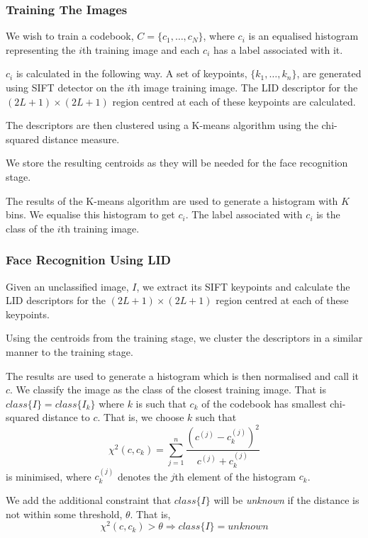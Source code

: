 \documentclass{article}
\begin{document}
\subsubsection{Training The Images}
We wish to train a codebook, $C=\{c_1, \ldots, c_N\}$, where $c_i$ is an equalised histogram representing the $i$th training image and each $c_i$ has a label associated with it.

$c_i$ is calculated in the following way. A set of keypoints, $\{k_1, \ldots, k_n\}$, are generated using SIFT detector on the $i$th image training image. The LID descriptor for the $(2L+1)\times(2L+1)$ region centred at each of these keypoints are calculated.

The descriptors are then clustered using a K-means algorithm using the chi-squared distance measure.

We store the resulting centroids as they will be needed for the face recognition stage.

The results of the K-means algorithm are used to generate a histogram with $K$ bins. We equalise this histogram to get $c_i$. The label associated with $c_i$ is the class of the $i$th training image.

\subsubsection{Face Recognition Using LID}
Given an unclassified image, $I$, we extract its SIFT keypoints and calculate the LID descriptors for the $(2L+1)\times(2L+1)$ region centred at each of these keypoints.

Using the centroids from the training stage, we cluster the descriptors in a similar manner to the training stage.

The results are used to generate a histogram which is then normalised and call it $c$. We classify the image as the class of the closest training image. That is $class\{I\}=class\{I_k\}$ where $k$ is such that $c_k$ of the codebook has smallest chi-squared distance to $c$. That is, we choose $k$ such that
\begin{equation}
	\chi^2(c, c_k) = \sum_{j=1}^{n}\frac{(c^{(j)} - c^{(j)}_k)^2}{c^{(j)} + c^{(j)}_k}
\end{equation}
is minimised, where $c^{(j)}_k$ denotes the $j$th element of the histogram $c_k$.

We add the additional constraint that $class\{I\}$ will be \textit{unknown} if the distance is not within some threshold, $\theta$. That is,
\begin{equation}
	\chi^2(c, c_k) > \theta \Rightarrow class\{I\} = unknown
\end{equation}
\end{document}

